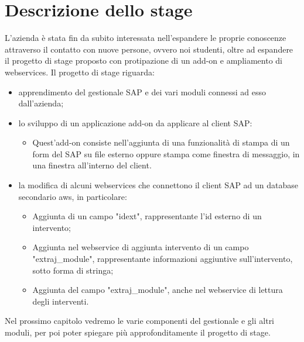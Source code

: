 \section{Descrizione dello stage}
L'azienda è stata fin da subito interessata nell'espandere le proprie conoscenze attraverso il contatto con nuove persone, ovvero noi studenti, oltre ad espandere il progetto di stage proposto con protipazione di un add-on e ampliamento di webservices.
Il progetto di stage riguarda:
\begin{itemize}
	\item apprendimento del gestionale SAP e dei vari moduli connessi ad esso dall'azienda;
	\item lo sviluppo di un applicazione add-on da applicare al client SAP:
	\begin{itemize}
            \item Quest'add-on consiste nell'aggiunta di una funzionalità di stampa di un form del SAP su file esterno oppure stampa come finestra di messaggio, in una finestra all'interno del client.
        \end{itemize}
    \item la modifica di alcuni webservices che connettono il client SAP ad un database secondario \gls{aws}, in particolare:
        \begin{itemize}
            \item Aggiunta di un campo "idext", rappresentante l'id esterno di un intervento;
            \item Aggiunta nel webservice di aggiunta intervento di un campo "extraj\_module", rappresentante informazioni aggiuntive sull'intervento, sotto forma di stringa;
            \item Aggiunta del campo "extraj\_module", anche nel webservice di lettura degli interventi.
        \end{itemize}
	\end{itemize}
Nel prossimo capitolo vedremo le varie componenti del gestionale e gli altri moduli, per poi poter spiegare più approfonditamente il progetto di stage.




